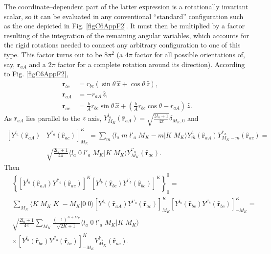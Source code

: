 The coordinate--dependent part of the latter expression is  a rotationally invariant scalar, so it can be evaluated in any conventional ``standard'' configuration such as the one depicted in Fig. \ref{figC6AppF2}. It must then be multiplied by a factor resulting of the integration of the remaining angular variables, which accounts for the rigid rotations needed to connect any arbitrary configuration to one of this type. This factor turns out to be $8\pi^2$ (a $4\pi$ factor for all possible orientations of, say, $\mathbf r_{aA}$ and a $2\pi$ factor for a complete rotation around its direction). According to Fig. \ref{figC6AppF2},
\begin{equation}\label{eqC6AppF22}
\begin{split}
\mathbf{r}_{bc}&=r_{bc}\left(\sin \theta\, \hat x+\cos \theta\,\hat z \right),\\
\mathbf{r}_{aA}&=-r_{aA}\,\hat z,\\
\mathbf{r}_{ac}&=\frac{b}{A}r_{bc}\sin \theta\,\hat x+\left(\frac{b}{A}r_{bc}\cos \theta-r_{aA}\right)\,\hat z.
\end{split}
\end{equation}
As $\mathbf{r}_{aA}$ lies parallel to the $z$ axis, $Y^{l_a}_{M_K} (\hat{\mathbf r}_{aA})=\sqrt{\frac{2l_a+1}{4\pi}}\delta_{M_K,0}$ and
\begin{equation}\label{eqC6AppG22}
\begin{split}
\left[ Y^{l_a} (\hat{\mathbf r}_{aA})\right.&\left. Y^{l'_a} (\hat{ \mathbf r}_{ac})\right]^K_{M_K}=\sum_{m}\langle l_a\;m\;l'_a\;M_K-m|K\;M_K\rangle Y^{l_a}_{m} (\hat{ \mathbf r}_{aA})Y^{l'_a}_{M_K-m} (\hat{\mathbf r}_{ac})=\\
&\sqrt{\frac{2l_a+1}{4\pi}} \langle l_a\;0\;l'_a\;M_K|K\;M_K\rangle Y^{l'_a}_{M_K} (\hat{ \mathbf r}_{ac}).
\end{split}
\end{equation}
Then
\begin{equation}\label{eqC6AppG23}
\begin{split}
&\left\{\left[ Y^{l_a} (\hat{\mathbf r}_{aA}) Y^{l'_a} (\hat{ \mathbf r}_{ac})\right]^K\left[ Y^{l_b} (\hat{\mathbf r}_{bc}) Y^{l'_b} (\hat{\mathbf r}_{bc})\right]^{K} \right\}^0_0=\\
&\sum_{M_K}\langle K\;M_K\;K\;-M_K|0\;0\rangle \left[ Y^{l_a} (\hat{\mathbf r}_{aA}) Y^{l'_a} (\hat{ \mathbf r}_{ac})\right]^K_{M_K}\left[ Y^{l_b} (\hat{\mathbf r}_{bc}) Y^{l'_b} (\hat{\mathbf r}_{bc})\right]^{K}_{-M_K}=\\
&\sqrt{\frac{2l_a+1}{4\pi}}\sum_{M_K}\frac{(-1)^{K+M_K}}{\sqrt{2K+1}} \langle l_a\;0\;l'_a\;M_K|K\;M_K\rangle\\
&\times \left[ Y^{l_b} (\hat{\mathbf r}_{bc}) Y^{l'_b} (\hat{\mathbf r}_{bc})\right]^{K}_{-M_K} Y^{l'_a}_{M_K} (\hat{ \mathbf r}_{ac}).
\end{split}
\end{equation}
